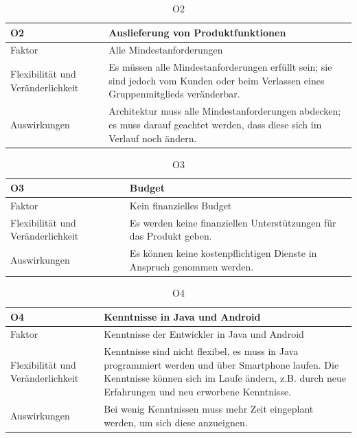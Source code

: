 \documentclass[fontsize=12pt,paper=a4,twoside]{scrartcl}
\begin{document}
\begin{table}[H]
\caption{O2}
\begin{tabular}{|p{3cm}|p{12cm}|}\hline
\textbf{O2} & \textbf{Auslieferung von Produktfunktionen}\\ \hline \hline
Faktor & Alle Mindestanforderungen\\ \hline
Flexibilität und Veränderlichkeit & Es müssen alle Mindestanforderungen erfüllt sein; sie sind jedoch vom Kunden oder beim Verlassen eines Gruppenmitglieds veränderbar.\\ \hline
Auswirkungen & Architektur muss alle Mindestanforderungen abdecken; es muss darauf geachtet werden, dass diese sich im Verlauf noch ändern.\\ \hline
\end{tabular}
\end{table}

\begin{table}[H]
\caption{O3}
\begin{tabular}{|p{3cm}|p{12cm}|}\hline
\textbf{O3} & \textbf{Budget} \\ \hline \hline
Faktor & Kein finanzielles Budget\\ \hline
Flexibilität und Veränderlichkeit & Es werden keine finanziellen Unterstützungen für das Produkt geben. \\ \hline
Auswirkungen & Es können keine kostenpflichtigen Dienste in Anspruch genommen werden.\\ \hline
\end{tabular}
\end{table}

\begin{table}[H]
\caption{O4}
\begin{tabular}{|p{3cm}|p{12cm}|}\hline
\textbf{O4} & \textbf{Kenntnisse in Java und Android} \\ \hline \hline
Faktor & Kenntnisse der Entwickler in Java und Android\\ \hline
Flexibilität und Veränderlichkeit & Kenntnisse sind nicht flexibel, es muss in Java programmiert werden und über Smartphone laufen. Die Kenntnisse können sich im Laufe ändern, z.B. durch neue Erfahrungen und neu erworbene Kenntnisse.\\ \hline
Auswirkungen & Bei wenig Kenntnissen muss mehr Zeit eingeplant werden, um sich diese anzueignen.\\ \hline
\end{tabular}
\end{table}
\end{document}
